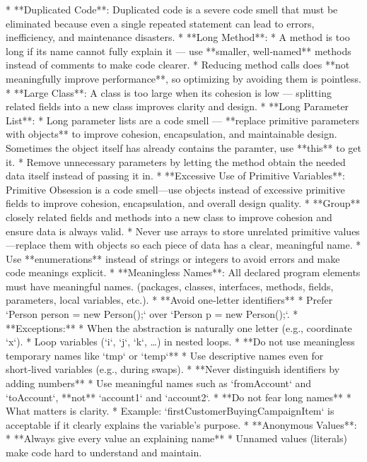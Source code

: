 \documentclass[a4paper]{scrartcl}
\begin{document}
* **Duplicated Code**: Duplicated code is a severe code smell that must be eliminated because even a single repeated statement can lead to errors, inefficiency, and maintenance disasters.
* **Long Method**:
  * A method is too long if its name cannot fully explain it — use **smaller, well‑named** methods instead of comments to make code clearer.
  * Reducing method calls does **not meaningfully improve performance**, so optimizing by avoiding them is pointless.
* **Large Class**: A class is too large when its cohesion is low — splitting related fields into a new class improves clarity and design.
* **Long Parameter List**:
  * Long parameter lists are a code smell — **replace primitive parameters with objects** to improve cohesion, encapsulation, and maintainable design. Sometimes the object itself has already contains the paramter, use **this** to get it.
  * Remove unnecessary parameters by letting the method obtain the needed data itself instead of passing it in.
* **Excessive Use of Primitive Variables**: Primitive Obsession is a code smell—use objects instead of excessive primitive fields to improve cohesion, encapsulation, and overall design quality.
  * **Group** closely related fields and methods into a new class to improve cohesion and ensure data is always valid.
  * Never use arrays to store unrelated primitive values—replace them with objects so each piece of data has a clear, meaningful name.
  * Use **enumerations** instead of strings or integers to avoid errors and make code meanings explicit.
* **Meaningless Names**: All declared program elements must have meaningful names. (packages, classes, interfaces, methods, fields, parameters, local variables, etc.).
  * **Avoid one‑letter identifiers**
      *   Prefer `Person person = new Person();` over `Person p = new Person();`.
      *   **Exceptions:**
          *   When the abstraction is naturally one letter (e.g., coordinate `x`).
          *   Loop variables (`i`, `j`, `k`, …) in nested loops.
  *   **Do not use meaningless temporary names like `tmp` or `temp`**
        *   Use descriptive names even for short‑lived variables (e.g., during swaps).
  *   **Never distinguish identifiers by adding numbers**
        *   Use meaningful names such as `fromAccount` and `toAccount`, **not** `account1` and `account2`.
  *   **Do not fear long names**
        *   What matters is clarity.
        *   Example: `firstCustomerBuyingCampaignItem` is acceptable if it clearly explains the variable’s purpose.
* **Anonymous Values**:
  *   **Always give every value an explaining name**
      *   Unnamed values (literals) make code hard to understand and maintain.
\end{document}
